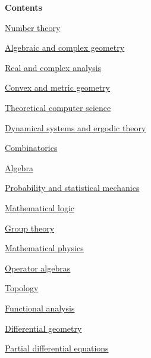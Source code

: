 \documentclass[11pt,a4paper]{article}
\begin{document}
{\large\bfseries Contents\par}
\vspace{7pt}
\noindent\hyperlink{subject1}{Number theory}\nobreak\hfill\pageref*{subject1}\par\vspace{5pt}
\noindent\hyperlink{subject3}{Algebraic and complex geometry}\nobreak\hfill\pageref*{subject3}\par\vspace{5pt}
\noindent\hyperlink{subject10}{Real and complex analysis}\nobreak\hfill\pageref*{subject10}\par\vspace{5pt}
\noindent\hyperlink{subject8}{Convex and metric geometry}\nobreak\hfill\pageref*{subject8}\par\vspace{5pt}
\noindent\hyperlink{subject14}{Theoretical computer science}\nobreak\hfill\pageref*{subject14}\par\vspace{5pt}
\noindent\hyperlink{subject12}{Dynamical systems and ergodic theory}\nobreak\hfill\pageref*{subject12}\par\vspace{5pt}
\noindent\hyperlink{subject13}{Combinatorics}\nobreak\hfill\pageref*{subject13}\par\vspace{5pt}
\noindent\hyperlink{subject2}{Algebra}\nobreak\hfill\pageref*{subject2}\par\vspace{5pt}
\noindent\hyperlink{subject15}{Probability and statistical mechanics}\nobreak\hfill\pageref*{subject15}\par\vspace{5pt}
\noindent\hyperlink{subject6}{Mathematical logic}\nobreak\hfill\pageref*{subject6}\par\vspace{5pt}
\noindent\hyperlink{subject5}{Group theory}\nobreak\hfill\pageref*{subject5}\par\vspace{5pt}
\noindent\hyperlink{subject17}{Mathematical physics}\nobreak\hfill\pageref*{subject17}\par\vspace{5pt}
\noindent\hyperlink{subject16}{Operator algebras}\nobreak\hfill\pageref*{subject16}\par\vspace{5pt}
\noindent\hyperlink{subject4}{Topology}\nobreak\hfill\pageref*{subject4}\par\vspace{5pt}
\noindent\hyperlink{subject11}{Functional analysis}\nobreak\hfill\pageref*{subject11}\par\vspace{5pt}
\noindent\hyperlink{subject7}{Differential geometry}\nobreak\hfill\pageref*{subject7}\par\vspace{5pt}
\noindent\hyperlink{subject9}{Partial differential equations}\nobreak\hfill\pageref*{subject9}\par\vspace{5pt}
\end{document}

